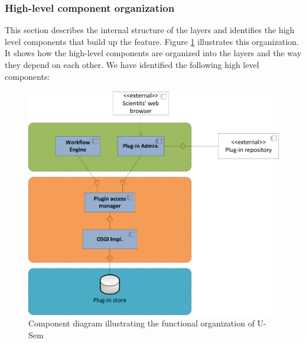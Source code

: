 \subsubsection{High-level component organization}

This section describes the internal structure of the layers and identifies the high level components that build up the feature. Figure \ref{fig_comp} illustrates this organization. It shows how the high-level components are organized into the layers and the way they depend on each other. We have identified the following high level components:

\begin{figure}[h!]
  \centering
  	\includegraphics[scale=0.6]{plug-in/layers/main-func.png}
  \caption{Component diagram illustrating the functional organization of U-Sem}
  \label{fig_comp}
\end{figure}

